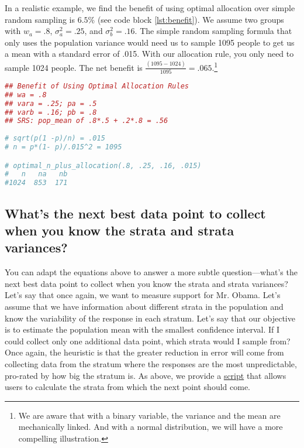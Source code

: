 \documentclass[12pt, letterpaper]{article}
\begin{document}
In a realistic example, we find the benefit of using optimal allocation over simple random sampling is $6.5\%$ (see code block \ref{lst:benefit}). We assume two groups with $w_a = .8$, $\sigma_a^2 = .25$, and $\sigma_b^2 = .16$. The simple random sampling formula that only uses the population variance would need us to sample 1095 people to get us a mean with a standard error of .015. With our allocation rule, you only need to sample 1024 people. The net benefit is $\frac{(1095 - 1024)}{1095} = .065$.\footnote{We are aware that with a binary variable, the variance and the mean are mechanically linked. And with a normal distribution, we will have a more compelling illustration.}
\label{code:benefit}
\begin{lstlisting}[caption={Benefit of Using Optimal Sampling},label={lst:benefit},language=R]
## Benefit of Using Optimal Allocation Rules
## wa = .8
## vara = .25; pa = .5
## varb = .16; pb = .8
## SRS: pop_mean of .8*.5 + .2*.8 = .56
   
# sqrt(p(1 -p)/n) = .015
# n = p*(1- p)/.015^2 = 1095

# optimal_n_plus_allocation(.8, .25, .16, .015)
#   n   na   nb 
#1024  853  171 
\end{lstlisting}

\subsection*{What's the next best data point to collect when you know the strata and strata variances?}

You can adapt the equations above to answer a more subtle question---what's the next best data point to collect when you know the strata and strata variances? Let's say that once again, we want to measure support for Mr. Obama. Let's assume that we have information about different strata in the population and know the variability of the response in each stratum. Let's say that our objective is to estimate the population mean with the smallest confidence interval. If I could collect only one additional data point, which strata would I sample from? Once again, the heuristic is that the greater reduction in error will come from collecting data from the stratum where the responses are the most unpredictable, pro-rated by how big the stratum is. As above, we provide a \href{https://github.com/soodoku/optimal\_data\_collection/scripts/next\_best\_data\_point.R}{script} that allows users to calculate the strata from which the next point should come.
\end{document}
